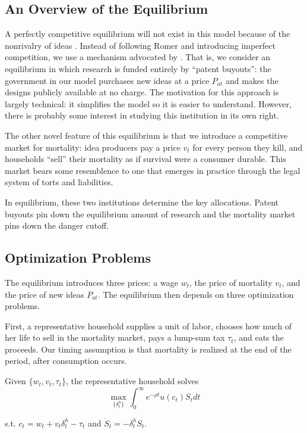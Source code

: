 \documentclass[12pt,twoside]{article}
\newcommand{\cn}[1]{\citet*{#1}}
\newcommand{\problem}[2]{\hspace{.1in} {{\color{ChadBlue}{\bf #1:} #2}}}
\begin{document}
\subsection{An Overview of the Equilibrium}

A perfectly competitive equilibrium will not exist in this model because
of the nonrivalry of ideas \citep{Romer90}. Instead of following Romer
and introducing imperfect competition, we use a mechanism advocated by
\cn{Kremer98}. That is, we consider an equilibrium in which research is
funded entirely by ``patent buyouts'': the government in our model purchases new
ideas at a price $P_{at}$ and makes the designs publicly available at no
charge. The motivation for this approach is largely technical: it
simplifies the model so it is easier to understand. However, there is
probably some interest in studying this institution in its own right.

The other novel feature of this equilibrium is that we introduce a
competitive market for mortality: idea producers pay a price $v_t$ for
every person they kill, and households ``sell'' their mortality as if
survival were a consumer durable. This market bears some resemblence to
one that emerges in practice through the legal system of torts and
liabilities.

In equilibrium, these two institutions determine the key allocations.
Patent buyouts pin down the equilibrium amount of research and the
mortality market pins down the danger cutoff.

\subsection{Optimization Problems}

The equilibrium introduces three prices: a wage $w_t$, the price of
mortality $v_t$, and the price of new ideas $P_{at}$. The equilibrium
then depends on three optimization problems.

First, a representative household supplies a unit of labor, chooses how
much of her life to sell in the mortality market, pays a lump-sum tax
$\tau_t$, and eats the proceeds. Our timing assumption is that mortality
is realized at the end of the period, after consumption occurs.\vspace{.1in}

\hypertarget{HH}{
\problem{HH Problem}{Given $\{w_t, v_t, \tau_t\}$, the representative
household solves
\[ \max_{\{\delta_t ^h\}} \int_0 ^\infty e^{-\rho t} u(c_t) S_t dt \]
\begin{center}
s.t.  $c_t = w_t + v_t \delta_t ^h - \tau_t$ and $\dot{S}_t = -\delta_t ^h S_t$.
\end{center}}}
\end{document}
